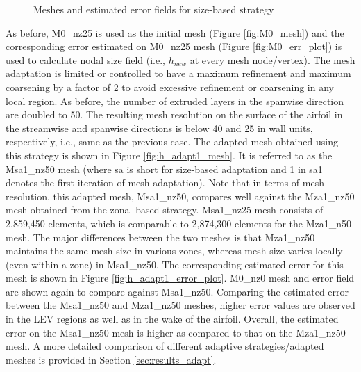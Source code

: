 \begin{figure}[H]
\caption{Meshes and estimated error fields for size-based strategy}
\end{figure}

As before, M0\_nz25 is used as the initial mesh (Figure \ref{fig:M0_mesh}) and the corresponding error estimated on M0\_nz25 mesh (Figure \ref{fig:M0_err_plot}) is used to calculate nodal size field (i.e., $h_{new}$ at every mesh node/vertex). The mesh adaptation is limited or controlled to have a maximum refinement and maximum coarsening by a factor of 2 to avoid excessive refinement or coarsening in any local region. As before, the number of extruded layers in the spanwise direction are doubled to 50.
The resulting mesh resolution on the surface of the airfoil in the streamwise and spanwise directions is below 40 and 25 in wall units, respectively, i.e., same as the previous case.
The adapted mesh obtained using this strategy is shown in Figure \ref{fig:h_adapt1_mesh}. It is referred to as the Msa1\_nz50 mesh (where sa is short for size-based adaptation and 1 in sa1 denotes the first iteration of mesh adaptation). Note that in terms of mesh resolution, this adapted mesh, Msa1\_nz50, compares well against the Mza1\_nz50 mesh obtained from the zonal-based strategy. Msa1\_nz25 mesh consists of 2,859,450 elements, which is comparable to 2,874,300 elements for the Mza1\_n50 mesh. The major differences between the two meshes is that Mza1\_nz50 maintains the same mesh size in various zones, whereas mesh size varies locally (even within a zone) in Msa1\_nz50.
The corresponding estimated error for this mesh is shown in Figure \ref{fig:h_adapt1_error_plot}. M0\_nz0 mesh and error field are shown again to compare against Msa1\_nz50. Comparing the estimated error between the Msa1\_nz50 and Mza1\_nz50 meshes, higher error values are observed in the LEV regions as well as in the wake of the airfoil. Overall, the estimated error on the Msa1\_nz50 mesh is higher as compared to that on the Mza1\_nz50 mesh. A more detailed comparison of different adaptive strategies/adapted meshes is provided in Section \ref{sec:results_adapt}.
